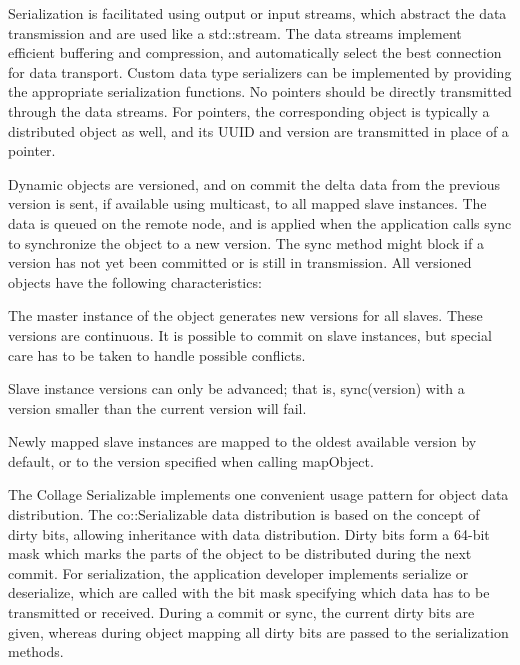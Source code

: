 Serialization is facilitated using output or input streams, which abstract the
data transmission and are used like a \textsf{std::stream}. The data streams
implement efficient buffering and compression, and automatically select the best
connection for data transport. Custom data type serializers can be implemented
by providing the appropriate serialization functions. No pointers should be
directly transmitted through the data streams. For pointers, the corresponding
object is typically a distributed object as well, and its UUID and version are
transmitted in place of a pointer.

Dynamic objects are versioned, and on \textsf{commit} the delta data from the
previous version is sent, if available using multicast, to all mapped slave
instances. The data is queued on the remote node, and is applied when the
application calls \textsf{sync} to synchronize the object to a new version. The
\textsf{sync} method might block if a version has not yet been committed or is
still in transmission. All versioned objects have the following characteristics:

\begin{compactitem}
\item The master instance of the object generates new versions for all
  slaves. These versions are continuous. It is possible to commit on slave
  instances, but special care has to be taken to handle possible
  conflicts.

\item Slave instance versions can only be advanced; that is,
\textsf{sync(version)} with a version smaller than the current version will
fail.

\item Newly mapped slave instances are mapped to the oldest available
  version by default, or to the version specified when calling
  \textsf{mapObject}.
\end{compactitem}

\label{sec:Serializable}The \textsf{Collage} Serializable implements one
convenient usage pattern for object data distribution. The
\textsf{co::Serializable} data distribution is based on the concept of dirty
bits, allowing inheritance with data distribution. Dirty bits form a 64-bit mask
which marks the parts of the object to be distributed during the next commit.
For serialization, the application developer implements \textsf{serialize} or
\textsf{deserialize}, which are called with the bit mask specifying which data
has to be transmitted or received. During a commit or sync, the current dirty
bits are given, whereas during object mapping all dirty bits are passed to the
serialization methods.


